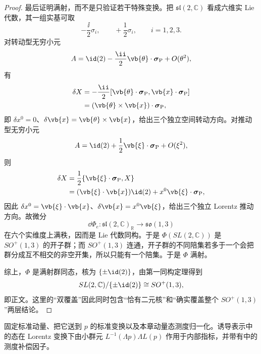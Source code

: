 \begin{proof}
最后证明满射，而不是只验证若干特殊变换。把 $\mathfrak{sl}(2,\mathbb C)$ 看成六维实 Lie 代数，其一组实基可取
\begin{equation*}
 -\frac{\ii}{2}\sigma_i,
 \qquad
 +\frac12\sigma_i,
 \qquad i=1,2,3.
\end{equation*}
对转动型无穷小元
\begin{equation*}
 A=\id(2)-\frac{\ii}{2}\vb{\theta}\cdot\boldsymbol\sigma_{\rm P}
 +O(\theta^2),
\end{equation*}
有
\begin{align*}
 \delta X
 &=-\frac{\ii}{2}
 [\vb{\theta}\cdot\boldsymbol\sigma_{\rm P},
   \vb{x}\cdot\boldsymbol\sigma_{\rm P}]\\
 &=(\vb{\theta}\times\vb{x})\cdot\boldsymbol\sigma_{\rm P},
\end{align*}
即 $\delta x^0=0$、$\delta\vb{x}=\vb{\theta}\times\vb{x}$，给出三个独立空间转动方向。对推动型无穷小元
\begin{equation*}
 A=\id(2)+\frac12\vb{\xi}\cdot\boldsymbol\sigma_{\rm P}
 +O(\xi^2),
\end{equation*}
则
\begin{align*}
 \delta X
 &=\frac12\{\vb{\xi}\cdot\boldsymbol\sigma_{\rm P},X\}\\
 &=(\vb{\xi}\cdot\vb{x})\id(2)
 +x^0\vb{\xi}\cdot\boldsymbol\sigma_{\rm P},
\end{align*}
因此 $\delta x^0=\vb{\xi}\cdot\vb{x}$、$\delta\vb{x}=x^0\vb{\xi}$，给出三个独立 Lorentz 推动方向。故微分
\begin{equation*}
 \dd\Phi_e:\mathfrak{sl}(2,\mathbb C)_{\mathbb R}
 \longrightarrow\mathfrak{so}(1,3)
\end{equation*}
在六个实维度上满秩，因而是 Lie 代数同构。于是 $\Phi(SL(2,\mathbb C))$ 是 $SO^+(1,3)$ 的开子群；而 $SO^+(1,3)$ 连通，开子群的不同陪集若多于一个会把群分成互不相交的非空开集，所以只能有一个陪集。于是 $\Phi$ 满射。

综上，$\Phi$ 是满射群同态，核为 $\{\pm\id(2)\}$，由第一同构定理得到
\begin{equation*}
 SL(2,\mathbb C)/\{\pm\id(2)\}
 \cong SO^+(1,3),
\end{equation*}
即正文。这里的“双覆盖”因此同时包含“恰有二元核”和“确实覆盖整个 $SO^+(1,3)$”两层结论。
\end{proof}

\begin{proposition}
固定标准动量、把它送到 $p$ 的标准变换以及本章动量态测度归一化。诱导表示中的态在 Lorentz 变换下由小群元 $L^{-1}(\Lambda p)\Lambda L(p)$ 作用于内部指标，并带有中的测度补偿因子。
\end{proposition}

